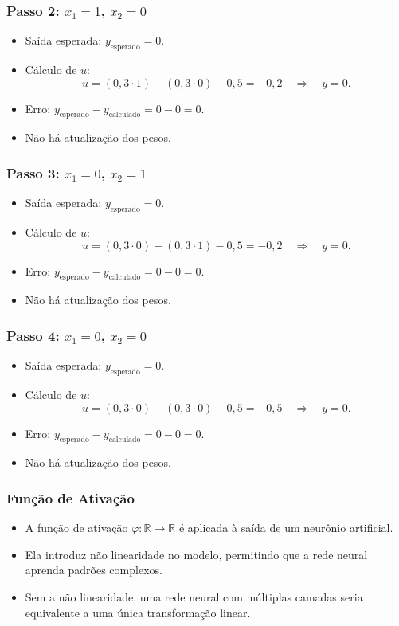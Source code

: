 \documentclass[aspectratio=169]{beamer}
\begin{document}
\begin{frame}
\frametitle{Passo 2: \( x_1 = 1 \), \( x_2 = 0 \)}
\begin{itemize}
    \item Saída esperada: \( y_{\text{esperado}} = 0 \).
    \item Cálculo de \( u \):
    \[
    u = (0,3 \cdot 1) + (0,3 \cdot 0) - 0,5 = -0,2 \quad \Rightarrow \quad y = 0.
    \]
    \item Erro: \( y_{\text{esperado}} - y_{\text{calculado}} = 0 - 0 = 0 \).
    \item Não há atualização dos pesos.
\end{itemize}
\end{frame}

\begin{frame}
\frametitle{Passo 3: \( x_1 = 0 \), \( x_2 = 1 \)}
\begin{itemize}
    \item Saída esperada: \( y_{\text{esperado}} = 0 \).
    \item Cálculo de \( u \):
    \[
    u = (0,3 \cdot 0) + (0,3 \cdot 1) - 0,5 = -0,2 \quad \Rightarrow \quad y = 0.
    \]
    \item Erro: \( y_{\text{esperado}} - y_{\text{calculado}} = 0 - 0 = 0 \).
    \item Não há atualização dos pesos.
\end{itemize}
\end{frame}

\begin{frame}
\frametitle{Passo 4: \( x_1 = 0 \), \( x_2 = 0 \)}
\begin{itemize}
    \item Saída esperada: \( y_{\text{esperado}} = 0 \).
    \item Cálculo de \( u \):
    \[
    u = (0,3 \cdot 0) + (0,3 \cdot 0) - 0,5 = -0,5 \quad \Rightarrow \quad y = 0.
    \]
    \item Erro: \( y_{\text{esperado}} - y_{\text{calculado}} = 0 - 0 = 0 \).
    \item Não há atualização dos pesos.
\end{itemize}
\end{frame}

\begin{frame}
\frametitle{Função de Ativação}
\begin{itemize}
    \item A função de ativação \( \varphi: \mathbb{R} \to \mathbb{R} \) é aplicada à saída de um neurônio artificial.
    \item Ela introduz não linearidade no modelo, permitindo que a rede neural aprenda padrões complexos.
    \item Sem a não linearidade, uma rede neural com múltiplas camadas seria equivalente a uma única transformação linear.
\end{itemize}
\end{frame}
\end{document}
